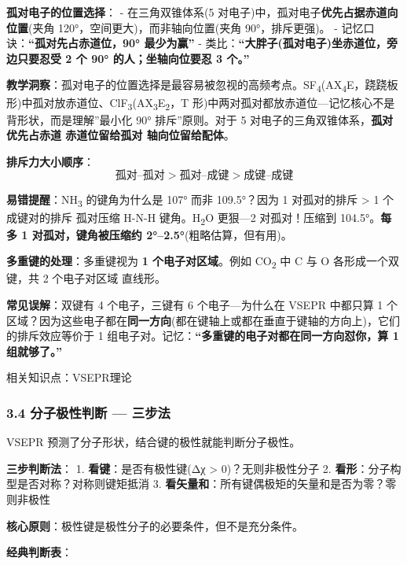 \textbf{孤对电子的位置选择}：
- 在三角双锥体系(5 对电子)中，孤对电子\textbf{优先占据赤道向位置}(夹角 120°，空间更大)，而非轴向位置(夹角 90°，排斥更强)。
- 记忆口诀：\textbf{``孤对先占赤道位，90° 最少为赢''}
- 类比：\textbf{``大胖子(孤对电子)坐赤道位，旁边只要忍受 2 个 90° 的人；坐轴向位要忍 3 个。''}

\textbf{教学洞察}：孤对电子的位置选择是最容易被忽视的高频考点。SF\textsubscript{4}(AX\textsubscript{4}E，跷跷板形)中孤对放赤道位、ClF\textsubscript{3}(AX\textsubscript{3}E\textsubscript{2}，T 形)中两对孤对都放赤道位---记忆核心不是背形状，而是理解''最小化 90° 排斥''原则。对于 5 对电子的三角双锥体系，\textbf{孤对优先占赤道 \箭 赤道位留给孤对 \箭 轴向位留给配体}。

\textbf{排斥力大小顺序}：
\[
\text{孤对–孤对} > \text{孤对–成键} > \text{成键–成键}
\]

\textbf{易错提醒}：NH\textsubscript{3} 的键角为什么是 107° 而非 109.5°？因为 1 对孤对的排斥 \textgreater{} 1 个成键对的排斥 \箭 孤对压缩 H-N-H 键角。H\textsubscript{2}O 更狠---2 对孤对！压缩到 104.5°。\textbf{每多 1 对孤对，键角被压缩约 2°--2.5°}(粗略估算，但有用)。

\textbf{多重键的处理}：多重键视为 \textbf{1 个电子对区域}。例如 CO\textsubscript{2} 中 C 与 O 各形成一个双键，共 2 个电子对区域 \箭 直线形。

\textbf{常见误解}：双键有 4 个电子，三键有 6 个电子---为什么在 VSEPR 中都只算 1 个区域？因为这些电子都在\textbf{同一方向}(都在键轴上或都在垂直于键轴的方向上)，它们的排斥效应等价于 1 组电子对。记忆：\textbf{``多重键的电子对都在同一方向怼你，算 1 组就够了。''}

相关知识点：VSEPR理论

\subsubsection{3.4 分子极性判断 --- 三步法}\label{ux5206ux5b50ux6781ux6027ux5224ux65ad-ux4e09ux6b65ux6cd5}

VSEPR 预测了分子形状，结合键的极性就能判断分子极性。

\textbf{三步判断法}：
1. \textbf{看键}：是否有极性键(Δχ \textgreater{} 0)？\箭 无则非极性分子
2. \textbf{看形}：分子构型是否对称？\箭 对称则键矩抵消
3. \textbf{看矢量和}：所有键偶极矩的矢量和是否为零？\箭 零则非极性

\textbf{核心原则}：极性键是极性分子的必要条件，但不是充分条件。

\textbf{经典判断表}：

